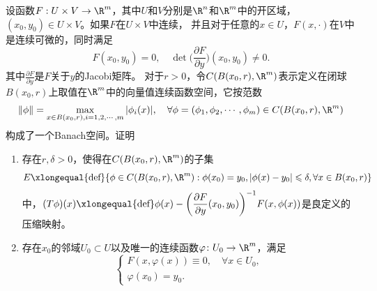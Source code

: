 \begin{8}[隐函数存在定理]
    设函数$F:U \times V \to \R^m$，其中$U$和$V$分别是$\R^n$和$\R^m$中的开区域，
    $(x_0,y_0) \in U \times V$。如果$F$在$U \times V$中连续，
    并且对于任意的$x\in U$，$F(x,\cdot)$在$V$中是连续可微的，同时满足
    \[F(x_0,y_0)=0,\quad\det\bigg(\frac{\partial F}{\partial y}\bigg)(x_0,y_0)\ne0.\]
    其中$\frac{\partial F}{\partial y}$是$F$关于$y$的Jacobi矩阵。
    对于$r>0$，令$C(B(x_0,r),\R^m)$表示定义在闭球$B(x_0,r)$上取值在$\R^m$中的向量值连续函数空间，它按范数
    \[\|\phi\|=\max_{x\in B(x_0,r),i=1,2,\cdots,m}|\phi_i(x)|,\quad\forall\phi=(\phi_1,\phi_2,\cdots,\phi_m)\in C(B(x_0,r),\R^m)\]
    构成了一个Banach空间。证明
    \begin{enumerate}[label=(\roman*)]
        \item 存在$r,\delta>0$，使得在$C(B(x_0,r),\R^m)$的子集
        \[E\xlongequal{\text{def}}\{\phi\in C(B(x_0,r),\R^m):
        \phi(x_0)=y_0,|\phi(x)-y_0|\leqslant\delta,\forall x\in B(x_0,r)\}\]
        中，$(T\phi)(x)\xlongequal{\text{def}}\phi(x)
        -\bigg(\dfrac{\partial F}{\partial y}(x_0,y_0)\bigg)^{-1}F(x,\phi(x))$是良定义的压缩映射。
        \item 存在$x_0$的邻域$U_0\subset U$以及唯一的连续函数$\varphi\colon U_0\to\R^m$，满足
        \[\begin{cases}
            F(x,\varphi(x))\equiv0,\quad\forall x\in U_0,\\
            \varphi(x_0)=y_0.
        \end{cases}\]
    \end{enumerate}
\end{8}

